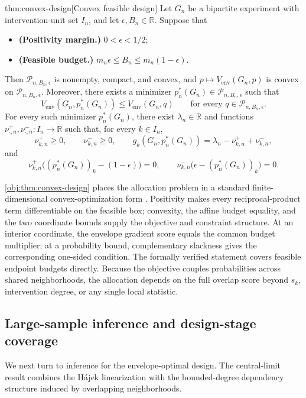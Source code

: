 \documentclass[11pt]{article}
\begin{document}
\begin{theoremv}{thm:convex-design}[Convex feasible design]
Let $G_n$ be a bipartite experiment with intervention-unit set $I_n$, and let $\epsilon,B_n\in\mathbb R$. Suppose that
\begin{itemize}
\item \textbf{(Positivity margin.)} $0<\epsilon<1/2$;
\item \textbf{(Feasible budget.)} $m_n\epsilon\le B_n\le m_n(1-\epsilon)$.
\end{itemize}
Then $\mathcal P_{n,B_n,\epsilon}$ is nonempty, compact, and convex, and $p\mapsto V_{\mathrm{env}}(G_n,p)$ is convex on $\mathcal P_{n,B_n,\epsilon}$. Moreover, there exists a minimizer $p_n^*(G_n)\in\mathcal P_{n,B_n,\epsilon}$ such that
\[
V_{\mathrm{env}}(G_n,p_n^*(G_n))
\le V_{\mathrm{env}}(G_n,q)
\qquad\text{for every }q\in\mathcal P_{n,B_n,\epsilon}.
\]
For every such minimizer $p_n^*(G_n)$, there exist $\lambda_n\in\mathbb R$ and functions $\nu^+_{\cdot,n},\nu^-_{\cdot,n}:I_n\to\mathbb R$ such that, for every $k\in I_n$,
\[
\nu^+_{k,n}\ge0,\qquad \nu^-_{k,n}\ge0,\qquad
g_k(G_n,p_n^*(G_n))=\lambda_n-\nu^+_{k,n}+\nu^-_{k,n},
\]
and
\[
\nu^+_{k,n}\bigl((p_n^*(G_n))_k-(1-\epsilon)\bigr)=0,
\qquad
\nu^-_{k,n}\bigl(\epsilon-(p_n^*(G_n))_k\bigr)=0.
\]
\end{theoremv}

\cref{obj:thm:convex-design} places the allocation problem in a standard finite-dimensional convex-optimization form \citep[Chs.~4--5]{BoydVandenberghe2004}. Positivity makes every reciprocal-product term differentiable on the feasible box; convexity, the affine budget equality, and the two coordinate bounds supply the objective and constraint structure. At an interior coordinate, the envelope gradient score equals the common budget multiplier; at a probability bound, complementary slackness gives the corresponding one-sided condition. The formally verified statement covers feasible endpoint budgets directly. Because the objective couples probabilities across shared neighborhoods, the allocation depends on the full overlap score beyond \(s_k\), intervention degree, or any single local statistic.

\subsection{Large-sample inference and design-stage coverage}

We next turn to inference for the envelope-optimal design. The central-limit result combines the Hájek linearization with the bounded-degree dependency structure induced by overlapping neighborhoods.
\end{document}

